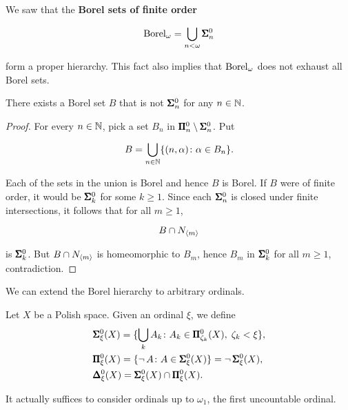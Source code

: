 We saw that the \textbf{Borel sets of finite order}

\begin{equation}
\operatorname{Borel}_\omega = \bigcup_{n < \omega} \pmb{\Sigma}^0_{n}
\end{equation}

form a proper hierarchy. This fact also implies that $\operatorname{Borel}_\omega$ does not exhaust all Borel sets.

\begin{proposition}\label{prop-nonfinite-borel}There exists a Borel set $B$ that is not $\pmb{\Sigma}^0_{n}$ for any $n \in \mathbb{N}$.

\end{proposition}\begin{proof}For every $n \in \mathbb{N}$, pick a set $B_n$ in $\pmb{\Pi}^0_{n} \setminus \pmb{\Sigma}^0_{n}$. Put

\begin{equation}
B = \bigcup_{n \in \mathbb{N}} \{(n,\alpha) \colon \alpha \in B_n \}.
\end{equation}

Each of the sets in the union is Borel and hence $B$ is Borel. If $B$ were of finite order, it would be $\pmb{\Sigma}^0_{k}$ for some $k \geq 1$. Since each $\pmb{\Sigma}^0_{n}$ is closed under finite intersections, it follows that for all $m \geq 1$,

\begin{equation}
B \cap N_{\langle m \rangle}
\end{equation}

is $\pmb{\Sigma}^0_{k}$. But $B \cap N_{\langle m \rangle}$ is homeomorphic to $B_m$, hence $B_m$ in $\pmb{\Sigma}^0_{k}$ for all $m \geq 1$, contradiction.

\end{proof}We can extend the Borel hierarchy to arbitrary ordinals.

\begin{definition}\label{def-transfinite-borel}Let $X$ be a Polish space. Given an ordinal $\xi$, we define
\begin{align*}
    & \pmb{\Sigma}^0_\xi(X) = \{ \bigcup_k A_k \colon A_k \in \pmb{\Pi}^0_{\zeta_k}(X),\; \zeta_k < \xi \}, \\
    & \pmb{\Pi}^0_\xi(X) = \{ \neg \, A \colon A \in \pmb{\Sigma}^0_\xi(X) \} = \neg \, \pmb{\Sigma}^0_\xi(X), \\
    & \pmb{\Delta}^0_\xi(X) = \pmb{\Sigma}^0_\xi(X) \cap \pmb{\Pi}^0_\xi(X). \\
\end{align*}
\end{definition}It actually suffices to consider ordinals up to $\omega_1$, the first uncountable ordinal.

